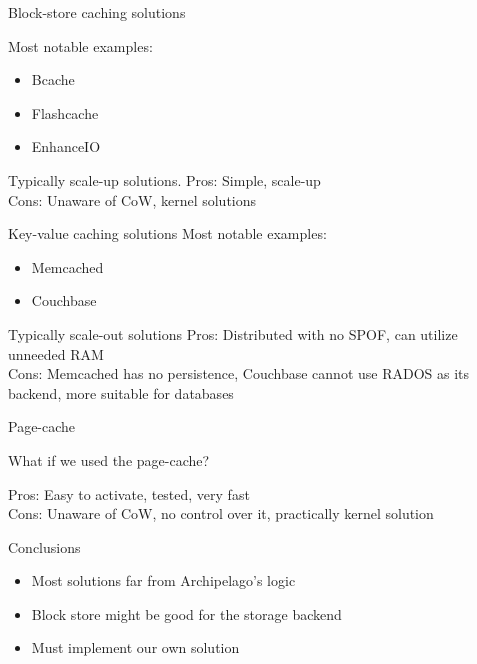 \begin{frame}{Block-store caching solutions}

	Most notable examples:
	\begin{itemize}
		\item Bcache
		\item Flashcache
		\item EnhanceIO
	\end{itemize}
	\dspc
	Typically scale-up solutions.
	\dspc
	Pros: Simple, scale-up\\
	Cons: Unaware of CoW, kernel solutions
\end{frame}

\begin{frame}{Key-value caching solutions}
	Most notable examples:
	\begin{itemize}
		\item Memcached
		\item Couchbase
	\end{itemize}
	\dspc
	Typically scale-out solutions
	\dspc
	Pros: Distributed with no SPOF, can utilize unneeded RAM\\
	Cons: Memcached has no persistence, Couchbase cannot use RADOS as its 
	backend, more suitable for databases
\end{frame}

\begin{frame}{Page-cache}

	What if we used the page-cache?

	\dspc
	Pros: Easy to activate, tested, very fast\\
	Cons: Unaware of CoW, no control over it, practically kernel solution\\

\end{frame}

\begin{frame}{Conclusions}

	\begin{itemize}
		\item Most solutions far from Archipelago's logic
		\item Block store might be good for the storage backend
		\item Must implement our own solution
	\end{itemize}
\end{frame}
	
